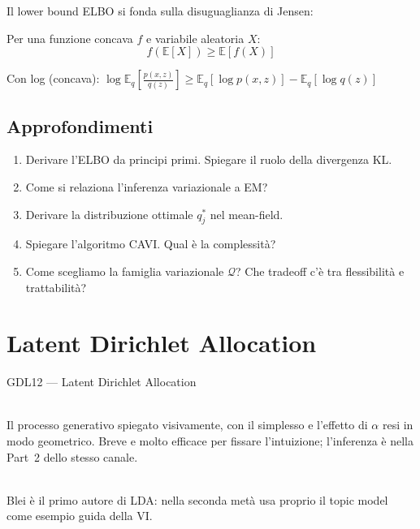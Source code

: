 Il lower bound ELBO si fonda sulla disuguaglianza di Jensen:

\begin{theorem}
  Per una funzione concava $f$ e variabile aleatoria $X$:
  \[f(\mathbb{E}[X]) \geq \mathbb{E}[f(X)]\]

  Con log (concava): $\log \mathbb{E}_q\left[\frac{p(x,z)}{q(z)}\right] \geq \mathbb{E}_q[\log p(x,z)] - \mathbb{E}_q[\log q(z)]$
\end{theorem}

\section{Approfondimenti}

\begin{tcolorbox}[title=Domande d'Esame]
  \begin{enumerate}
    \item Derivare l'ELBO da principi primi. Spiegare il ruolo della divergenza KL.
    \item Come si relaziona l'inferenza variazionale a EM?
    \item Derivare la distribuzione ottimale $q_j^*$ nel mean-field.
    \item Spiegare l'algoritmo CAVI. Qual è la complessità?
    \item Come scegliamo la famiglia variazionale $\mathcal{Q}$? Che tradeoff c'è tra flessibilità e trattabilità?
  \end{enumerate}
\end{tcolorbox}

\chapter{Latent Dirichlet Allocation}

\begin{risorsevideo}{GDL12 — Latent Dirichlet Allocation}

\medskip
{}\\
Il processo generativo spiegato visivamente, con il simplesso e l'effetto di $\alpha$ resi in modo geometrico. Breve e molto efficace per fissare l'intuizione; l'inferenza è nella Part~2 dello stesso canale.

\medskip
{}\\
Blei è il primo autore di LDA: nella seconda metà usa proprio il topic model come esempio guida della VI.
\end{risorsevideo}

